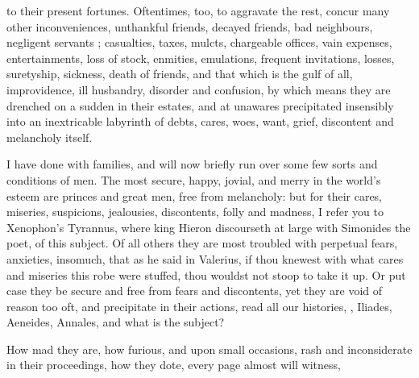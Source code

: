 to their present fortunes. Oftentimes, too, to aggravate the rest, concur many
other inconveniences, unthankful friends, decayed friends, bad neighbours,
negligent servants ; casualties, taxes, mulcts, chargeable offices, vain expenses,
entertainments, loss of stock, enmities, emulations, frequent invitations,
losses, suretyship, sickness, death of friends, and that which is the gulf of
all, improvidence, ill husbandry, disorder and confusion, by which means they
are drenched on a sudden in their estates, and at unawares precipitated
insensibly into an inextricable labyrinth of debts, cares, woes, want, grief,
discontent and melancholy itself.

I have done with families, and will now briefly run over some few sorts and
conditions of men. The most secure, happy, jovial, and merry in the world's
esteem are princes and great men, free from melancholy: but for their cares,
miseries, suspicions, jealousies, discontents, folly and madness, I refer you
to Xenophon's Tyrannus, where king Hieron discourseth at large with Simonides
the poet, of this subject. Of all others they are most troubled with perpetual
fears, anxieties, insomuch, that as he said in Valerius, if
thou knewest with what cares and miseries this robe were stuffed, thou wouldst
not stoop to take it up. Or put case they be secure and free from fears and
discontents, yet they are void of reason too oft, and
precipitate in their actions, read all our histories, , Iliades, Aeneides, Annales, and what is the subject?


How mad they are, how furious, and upon small occasions, rash and inconsiderate
in their proceedings, how they dote, every page almost will witness,


